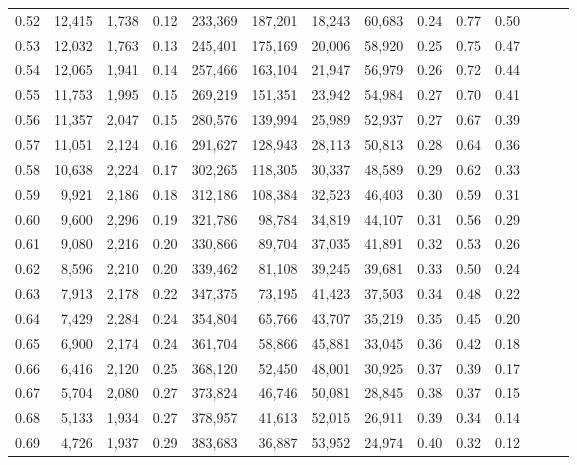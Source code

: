 \begin{tabular}{rrrrrrrrrrrrrr}
0.52 &  12,415 &  1,738 &  0.12 &  233,369 &  187,201 &  18,243 &  60,683 &  0.24 &  0.77 &      0.50 \\
0.53 &  12,032 &  1,763 &  0.13 &  245,401 &  175,169 &  20,006 &  58,920 &  0.25 &  0.75 &      0.47 \\
0.54 &  12,065 &  1,941 &  0.14 &  257,466 &  163,104 &  21,947 &  56,979 &  0.26 &  0.72 &      0.44 \\
0.55 &  11,753 &  1,995 &  0.15 &  269,219 &  151,351 &  23,942 &  54,984 &  0.27 &  0.70 &      0.41 \\
0.56 &  11,357 &  2,047 &  0.15 &  280,576 &  139,994 &  25,989 &  52,937 &  0.27 &  0.67 &      0.39 \\
0.57 &  11,051 &  2,124 &  0.16 &  291,627 &  128,943 &  28,113 &  50,813 &  0.28 &  0.64 &      0.36 \\
0.58 &  10,638 &  2,224 &  0.17 &  302,265 &  118,305 &  30,337 &  48,589 &  0.29 &  0.62 &      0.33 \\
0.59 &   9,921 &  2,186 &  0.18 &  312,186 &  108,384 &  32,523 &  46,403 &  0.30 &  0.59 &      0.31 \\
0.60 &   9,600 &  2,296 &  0.19 &  321,786 &   98,784 &  34,819 &  44,107 &  0.31 &  0.56 &      0.29 \\
0.61 &   9,080 &  2,216 &  0.20 &  330,866 &   89,704 &  37,035 &  41,891 &  0.32 &  0.53 &      0.26 \\
0.62 &   8,596 &  2,210 &  0.20 &  339,462 &   81,108 &  39,245 &  39,681 &  0.33 &  0.50 &      0.24 \\
0.63 &   7,913 &  2,178 &  0.22 &  347,375 &   73,195 &  41,423 &  37,503 &  0.34 &  0.48 &      0.22 \\
0.64 &   7,429 &  2,284 &  0.24 &  354,804 &   65,766 &  43,707 &  35,219 &  0.35 &  0.45 &      0.20 \\
0.65 &   6,900 &  2,174 &  0.24 &  361,704 &   58,866 &  45,881 &  33,045 &  0.36 &  0.42 &      0.18 \\
0.66 &   6,416 &  2,120 &  0.25 &  368,120 &   52,450 &  48,001 &  30,925 &  0.37 &  0.39 &      0.17 \\
0.67 &   5,704 &  2,080 &  0.27 &  373,824 &   46,746 &  50,081 &  28,845 &  0.38 &  0.37 &      0.15 \\
0.68 &   5,133 &  1,934 &  0.27 &  378,957 &   41,613 &  52,015 &  26,911 &  0.39 &  0.34 &      0.14 \\
0.69 &   4,726 &  1,937 &  0.29 &  383,683 &   36,887 &  53,952 &  24,974 &  0.40 &  0.32 &      0.12 \\

\end{tabular}
